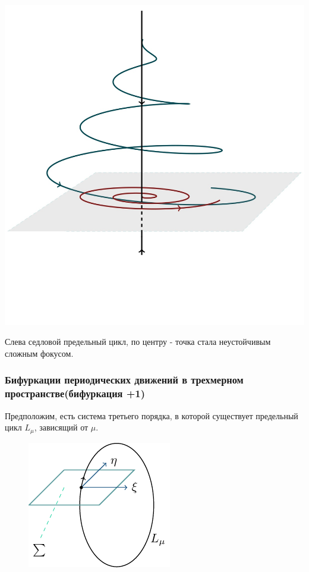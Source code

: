 \begin{center}
\begin{minipage}{0.3\linewidth}
        \vspace{-50pt}
        \label{fig:1}
    \end{minipage}
\hfill     
    \begin{minipage}{0.3\linewidth}
        \includegraphics[width=\linewidth]{fig/fig59.jpg} 
        \vspace{-50pt}
        \label{fig:1}
    \end{minipage}    
\end{center}

Слева седловой предельный цикл, по центру - точка стала неустойчивым сложным фокусом.

\subsubsection{Бифуркации периодических движений в трехмерном пространстве(бифуркация +1)}
Предположим, есть система третьего порядка, в которой существует предельный цикл $L_{\mu}$, зависящий от $\mu$.

\begin{figure} 
	\vspace{0.1em}
	\centering
	\includegraphics[scale=1.5]{fig/fig62.pdf}
	\vspace{-0.25em}
\end{figure}

